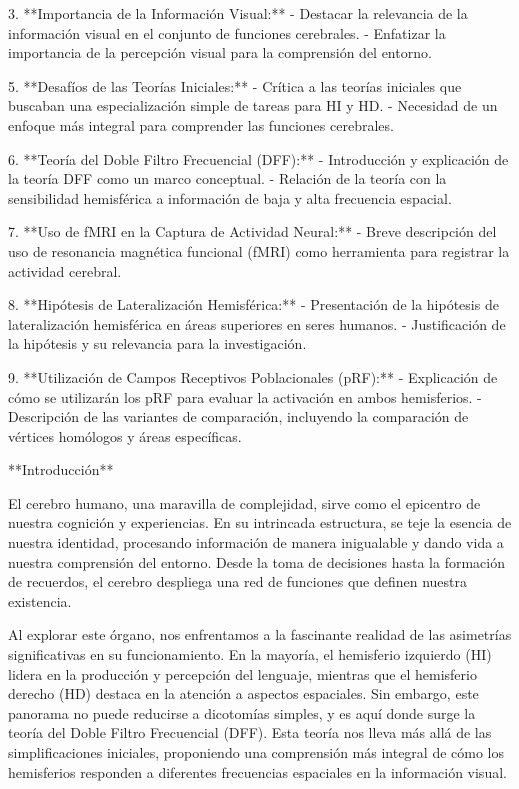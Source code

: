 \documentclass{article}
\begin{document}
	3. **Importancia de la Información Visual:**
	- Destacar la relevancia de la información visual en el conjunto de funciones cerebrales.
	- Enfatizar la importancia de la percepción visual para la comprensión del entorno.
	
	5. **Desafíos de las Teorías Iniciales:**
	- Crítica a las teorías iniciales que buscaban una especialización simple de tareas para HI y HD.
	- Necesidad de un enfoque más integral para comprender las funciones cerebrales.
	
	6. **Teoría del Doble Filtro Frecuencial (DFF):**
	- Introducción y explicación de la teoría DFF como un marco conceptual.
	- Relación de la teoría con la sensibilidad hemisférica a información de baja y alta frecuencia espacial.
	
	7. **Uso de fMRI en la Captura de Actividad Neural:**
	- Breve descripción del uso de resonancia magnética funcional (fMRI) como herramienta para registrar la actividad cerebral.
	
	8. **Hipótesis de Lateralización Hemisférica:**
	- Presentación de la hipótesis de lateralización hemisférica en áreas superiores en seres humanos.
	- Justificación de la hipótesis y su relevancia para la investigación.
	
	9. **Utilización de Campos Receptivos Poblacionales (pRF):**
	- Explicación de cómo se utilizarán los pRF para evaluar la activación en ambos hemisferios.
	- Descripción de las variantes de comparación, incluyendo la comparación de vértices homólogos y áreas específicas.
	
	\newpage
	
	**Introducción**
	
	El cerebro humano, una maravilla de complejidad, sirve como el epicentro de nuestra cognición y experiencias. En su intrincada estructura, se teje la esencia de nuestra identidad, procesando información de manera inigualable y dando vida a nuestra comprensión del entorno. Desde la toma de decisiones hasta la formación de recuerdos, el cerebro despliega una red de funciones que definen nuestra existencia.
	
	Al explorar este órgano, nos enfrentamos a la fascinante realidad de las asimetrías significativas en su funcionamiento. En la mayoría, el hemisferio izquierdo (HI) lidera en la producción y percepción del lenguaje, mientras que el hemisferio derecho (HD) destaca en la atención a aspectos espaciales. Sin embargo, este panorama no puede reducirse a dicotomías simples, y es aquí donde surge la teoría del Doble Filtro Frecuencial (DFF). Esta teoría nos lleva más allá de las simplificaciones iniciales, proponiendo una comprensión más integral de cómo los hemisferios responden a diferentes frecuencias espaciales en la información visual.
	
\end{document}
